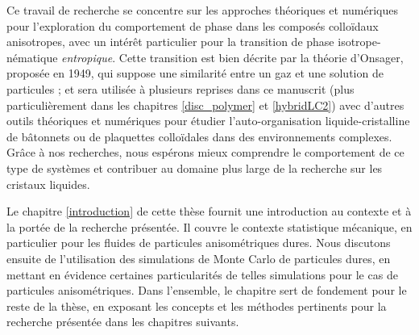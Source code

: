 Ce travail de recherche se concentre sur les approches théoriques et numériques pour l'exploration du comportement de phase dans les composés colloïdaux anisotropes, avec un intérêt particulier pour la transition de phase isotrope-nématique {\em entropique}. Cette transition est bien décrite par la théorie d'Onsager, proposée en 1949, qui suppose une similarité entre un gaz et une solution de particules \cite{onsager1949} ; et sera utilisée à plusieurs reprises dans ce manuscrit (plus particulièrement dans les chapitres \ref{disc_polymer} et \ref{hybridLC2}) avec d'autres outils théoriques et numériques pour étudier l'auto-organisation liquide-cristalline de bâtonnets ou de plaquettes colloïdales dans des environnements complexes. Grâce à nos recherches, nous espérons mieux comprendre le comportement de ce type de systèmes et contribuer au domaine plus large de la recherche sur les cristaux liquides.



Le chapitre \ref{introduction} de cette thèse fournit une introduction au contexte et à la portée de la recherche présentée. Il couvre le contexte statistique mécanique, en particulier pour les fluides de particules anisométriques dures. Nous discutons ensuite de l'utilisation des simulations de Monte Carlo de particules dures, en mettant en évidence certaines particularités de telles simulations pour le cas de particules anisométriques. Dans l'ensemble, le chapitre sert de fondement pour le reste de la thèse, en exposant les concepts et les méthodes pertinents pour la recherche présentée dans les chapitres suivants.

